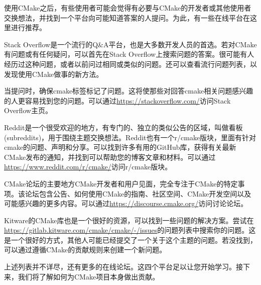 
使用CMake之后，有些使用者可能会觉得有必要与CMake的开发者或其他使用者交换想法，并找到一个平台向可能知道答案的人提问。为此，有一些在线平台在这里进行推荐。


Stack Overflow是一个流行的Q\&A平台，也是大多数开发人员的首选。若对CMake有问题或有任何疑问，可以首先在Stack Overflow上搜索问题的答案。很可能有人经历过这种问题，或者以前问过相同或类似的问题。还可以查看流行问题列表，以发现使用CMake做事的新方法。

当提问时，确保cmake标签标记了问题。这将使那些对回答cmake相关问题感兴趣的人更容易找到您的问题。可以通过\url{https://stackoverflow.com/}访问Stack Overflow主页。


Reddit是一个很受欢迎的地方，有专门的、独立的类似公告的区域，叫做看板(subreddits)，用于围绕主题交换想法。Reddit也有一个r/cmake版块，里面有针对cmake的问题、声明和分享。可以找到许多有用的GitHub库，获得有关最新CMake发布的通知，并找到可以帮助您的博客文章和材料。可以通过\url{https://www.reddit.com/r/cmake/}访问r/cmake版块。


CMake论坛的主要地方CMake开发者和用户见面，完全专注于CMake的特定事项。该论坛包含公告、如何使用CMake的指南、社区空间、CMake开发空间以及可能感兴趣的更多内容。可以通过\url{https://discourse.cmake.org/}访问讨论论坛。


Kitware的CMake库也是一个很好的资源，可以找到一些问题的解决方案。尝试在\url{https://gitlab.kitware.com/cmake/cmake/-/issues}的问题列表中搜索你的问题。这是一个很好的方式，其他人可能已经提交了一个关于这个主题的问题。若没找到，可以通过遵循CMake的贡献规则来创建一个新问题。

上述列表并不详尽，还有更多的在线论坛。这四个平台足以让您开始学习。接下来，我们将了解如何为CMake项目本身做出贡献。